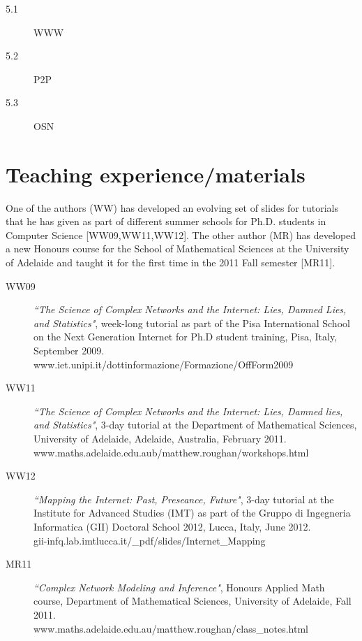 \documentclass{sig-alternate-10pt}
\begin{document}
\begin{description}
\item[5.1] WWW
\item[5.2] P2P
\item[5.3] OSN
\end{description}

\section{Teaching experience/materials}

One of the authors (WW) has developed an evolving set of slides for tutorials that he has given as part of different summer schools for Ph.D. students in Computer Science [WW09,WW11,WW12]. The other author (MR) has developed a new Honours course for the School of Mathematical Sciences at the University of Adelaide and taught it for the first time in the 2011 Fall semester [MR11]. 

\begin{description}
\item[WW09] {\em ``The Science of Complex Networks and the Internet: Lies, Damned Lies, and Statistics"}, week-long tutorial as part of the Pisa International School on the Next Generation Internet for Ph.D student training, Pisa, Italy, September 2009. \\
{\footnotesize www.iet.unipi.it/dottinformazione/Formazione/OffForm2009}

\item[WW11] {\em ``The Science of Complex Networks and the Internet: Lies, Damned lies, and Statistics"}, 3-day tutorial at the Department of Mathematical Sciences, University of Adelaide, Adelaide, Australia, February 2011. \\
{\footnotesize www.maths.adelaide.edu.aub/matthew.roughan/workshops.html}

\item[WW12] {\em ``Mapping the Internet: Past, Preseance, Future"}, 3-day tutorial at the Institute for Advanced Studies (IMT) as part of the Gruppo di Ingegneria Informatica (GII) Doctoral School 2012, Lucca, Italy, June 2012. \\
{\footnotesize gii-infq.lab.imtlucca.it/\_pdf/slides/Internet\_Mapping}

\item[MR11] {\em ``Complex Network Modeling and Inference"}, Honours Applied Math course, Department of Mathematical Sciences, University of Adelaide, Fall 2011. \\
{\footnotesize www.maths.adelaide.edu.au/matthew.roughan/class\_notes.html}

\end{description}
\bigskip
\end{document}
